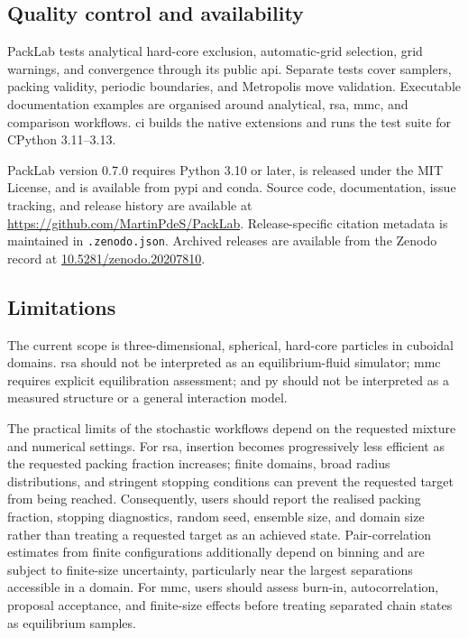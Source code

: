 \documentclass[preprint,12pt]{elsarticle}
\begin{document}
\subsection{Quality control and availability}

PackLab tests analytical hard-core exclusion, automatic-grid selection, grid warnings, and convergence through its public \gls{api}. %
Separate tests cover samplers, packing validity, periodic boundaries, and Metropolis move validation. %
Executable documentation examples are organised around analytical, \gls{rsa}, \gls{mmc}, and comparison workflows. %
\Gls{ci} builds the native extensions and runs the test suite for CPython 3.11--3.13. %

PackLab version 0.7.0 requires Python 3.10 or later, is released under the MIT License, and is available from \gls{pypi} and conda. %
Source code, documentation, issue tracking, and release history are available at \url{https://github.com/MartinPdeS/PackLab}. %
Release-specific citation metadata is maintained in \texttt{.zenodo.json}. %
Archived releases are available from the Zenodo record at \href{https://doi.org/10.5281/zenodo.20207810}{10.5281/zenodo.20207810}. %

\subsection{Limitations}

The current scope is three-dimensional, spherical, hard-core particles in cuboidal domains. %
\gls{rsa} should not be interpreted as an equilibrium-fluid simulator; \gls{mmc} requires explicit equilibration assessment; and \gls{py} should not be interpreted as a measured structure or a general interaction model. %

The practical limits of the stochastic workflows depend on the requested mixture and numerical settings. %
For \gls{rsa}, insertion becomes progressively less efficient as the requested packing fraction increases; finite domains, broad radius distributions, and stringent stopping conditions can prevent the requested target from being reached. %
Consequently, users should report the realised packing fraction, stopping diagnostics, random seed, ensemble size, and domain size rather than treating a requested target as an achieved state. %
Pair-correlation estimates from finite configurations additionally depend on binning and are subject to finite-size uncertainty, particularly near the largest separations accessible in a domain. %
For \gls{mmc}, users should assess burn-in, autocorrelation, proposal acceptance, and finite-size effects before treating separated chain states as equilibrium samples. %
\end{document}

